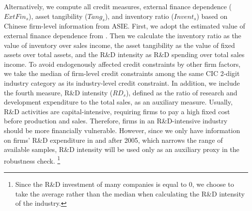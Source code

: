 Alternatively, we compute all credit measures, external finance dependence ($ExtFin_{s}$), asset tangibility ($Tang_{s}$), and inventory ratio ($Invent_{s}$) based on Chinese firm-level information from ASIE. First, we adopt the estimated value of external finance dependence from \cite{fan-lai-li2015}. Then we calculate the inventory ratio as the value of inventory over sales income, the asset tangibility as the value of fixed assets over total assets, and the R\&D intensity as R\&D spending over total sales income. To avoid endogenously affected credit constraints by other firm factors, we take the median of firm-level credit constraints among the same CIC 2-digit industry category as its industry-level credit constraint. In addition, we include the fourth measure, R\&D intensity ($RD_{s}$), defined as the ratio of research and development expenditure to the total sales, as an auxiliary measure. Usually, R\&D activities are capital-intensive, requiring firms to pay a high fixed cost before production and sales. Therefore, firms in an R\&D-intensive industry should be more financially vulnerable. However, since we only have information on firms' R\&D expenditure in and after 2005, which narrows the range of available samples, R\&D intensity will be used only as an auxiliary proxy in the robustness check. \footnote{Since the R\&D investment of many companies is equal to 0, we choose to take the average rather than the median when calculating the R\&D intensity of the industry.}

